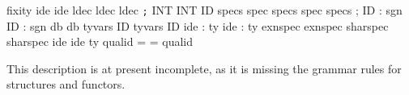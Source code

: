 {\begin{tabbing}
\also      fixity ide  ide  
\also      ldec ldec  
\also      ldec \verb";" 
      INT 
\also      {} 
\also      {} INT 
\also      {}  
\also      {}  
        ID
\also      {} specs 
      spec
\also      specs spec
\also      specs ;
        ID : sgn    ID : sgn
\also      {} db    db
\also      {} tyvars ID    tyvars ID
\also      {} ide : ty    ide : ty
\also      {} exnspec    exnspec
\also      {} sharspec    sharspec
    ide
\also       ide  ty
   qualid =  = qualid
\end{tabbing}
This description is at present incomplete, as it is missing the
grammar rules for structures and functors.
}
